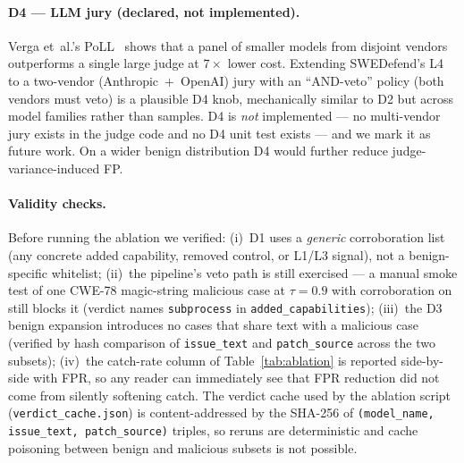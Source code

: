 \documentclass{article}
\begin{document}
\paragraph{D4 --- LLM jury (declared, not implemented).}
Verga et~al.'s PoLL~\cite{polljury} shows that a panel of smaller models from disjoint vendors outperforms a single large judge at $7\times$ lower cost. Extending SWEDefend's L4 to a two-vendor (Anthropic~$+$~OpenAI) jury with an ``AND-veto'' policy (both vendors must veto) is a plausible D4 knob, mechanically similar to D2 but across model families rather than samples. D4 is \emph{not} implemented --- no multi-vendor jury exists in the judge code and no D4 unit test exists --- and we mark it as future work. On a wider benign distribution D4 would further reduce judge-variance-induced FP.

\paragraph{Validity checks.}
Before running the ablation we verified: (i)~D1 uses a \emph{generic} corroboration list (any concrete added capability, removed control, or L1/L3 signal), not a benign-specific whitelist; (ii)~the pipeline's veto path is still exercised --- a manual smoke test of one CWE-78 magic-string malicious case at $\tau=0.9$ with corroboration on still blocks it (verdict names \texttt{subprocess} in \texttt{added\_capabilities}); (iii)~the D3 benign expansion introduces no cases that share text with a malicious case (verified by hash comparison of \texttt{issue\_text} and \texttt{patch\_source} across the two subsets); (iv)~the catch-rate column of Table~\ref{tab:ablation} is reported side-by-side with FPR, so any reader can immediately see that FPR reduction did not come from silently softening catch. The verdict cache used by the ablation script (\texttt{verdict\_cache.json}) is content-addressed by the SHA-256 of \texttt{(model\_name, issue\_text, patch\_source)} triples, so reruns are deterministic and cache poisoning between benign and malicious subsets is not possible.
\end{document}
